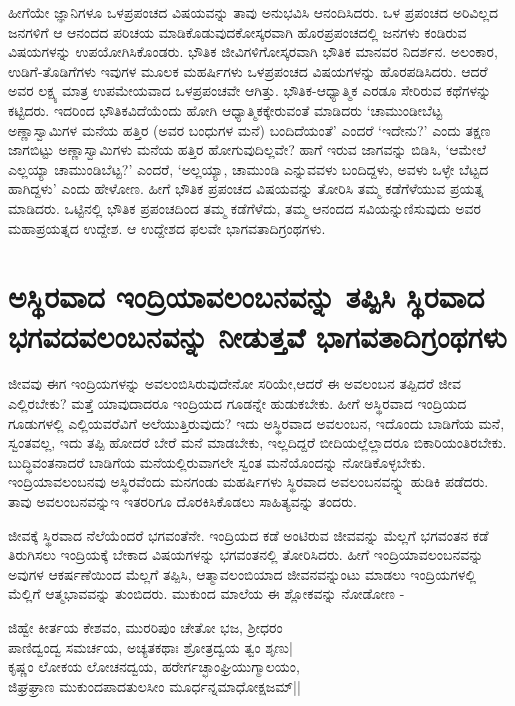 ಹೀಗೆಯೇ ಜ್ಞಾನಿಗಳೂ ಒಳಪ್ರಪಂಚದ ವಿಷಯವನ್ನು ತಾವು ಅನುಭವಿಸಿ ಆನಂದಿಸಿದರು. ಒಳ ಪ್ರಪಂಚದ ಅರಿವಿಲ್ಲದ ಜನಗಳಿಗೆ ಆ ಆನಂದದ ಪರಿಚಯ ಮಾಡಿಕೊಡುವುದಕೋಸ್ಕರವಾಗಿ ಹೊರಪ್ರಪಂಚದಲ್ಲಿ ಜನಗಳು ಕಂಡಿರುವ ವಿಷಯಗಳನ್ನು ಉಪಯೋಗಿಸಿಕೊಂಡರು. ಭೌತಿಕ ಜೀವಿಗಳಿಗೋಸ್ಕರವಾಗಿ ಭೌತಿಕ ಮಾನವರ ನಿದರ್ಶನ. ಅಲಂಕಾರ, ಉಡಿಗೆ-ತೊಡಿಗೆಗಳು ಇವುಗಳ ಮೂಲಕ ಮಹರ್ಷಿಗಳು ಒಳಪ್ರಪಂಚದ ವಿಷಯಗಳನ್ನು ಹೊರಪಡಿಸಿದರು. ಆದರೆ ಅವರ ಲಕ್ಷ್ಯ ಮಾತ್ರ ಉಪಮೇಯವಾದ ಒಳಪ್ರಪಂಚವೇ ಆಗಿತ್ತು. ಭೌತಿಕ-ಆಧ್ಯಾತ್ಮಿಕ ಎರಡೂ ಸೇರಿರುವ ಕಥೆಗಳನ್ನು ಕಟ್ಟಿದರು. ಇದರಿಂದ ಭೌತಿಕವಿದೆಯೆಂದು ಹೋಗಿ ಆಧ್ಯಾತ್ಮಿಕಕ್ಕೇರುವಂತೆ ಮಾಡಿದರು `ಚಾಮುಂಡೀಬೆಟ್ಟ ಅಣ್ಣಾಸ್ವಾಮಿಗಳ ಮನೆಯ ಹತ್ತಿರ (ಅವರ ಬಂಧುಗಳ ಮನೆ) ಬಂದಿದೆಯಂತೆ' ಎಂದರೆ `ಇದೇನು?' ಎಂದು ತಕ್ಷಣ ಜಾಗಬಿಟ್ಟು ಅಣ್ಣಾಸ್ವಾಮಿಗಳು ಮನೆಯ ಹತ್ತಿರ ಹೋಗುವುದಿಲ್ಲವೇ? ಹಾಗೆ ಇರುವ ಜಾಗವನ್ನು ಬಿಡಿಸಿ, `ಆಮೇಲೆ ಎಲ್ಲಯ್ಯಾ ಚಾಮುಂಡಿಬೆಟ್ಟ?' ಎಂದರೆ, `ಅಲ್ಲಯ್ಯಾ, ಚಾಮುಂಡಿ ಎನ್ನುವವಳು ಬಂದಿದ್ದಳು, ಅವಳು ಒಳ್ಳೇ ಬೆಟ್ಟದ ಹಾಗಿದ್ದಳು' ಎಂದು ಹೇಳೋಣ. ಹೀಗೆ ಭೌತಿಕ ಪ್ರಪಂಚದ ವಿಷಯವನ್ನು ತೋರಿಸಿ ತಮ್ಮ ಕಡೆಗೆಳೆಯುವ ಪ್ರಯತ್ನ ಮಾಡಿದರು. ಒಟ್ಟಿನಲ್ಲಿ ಭೌತಿಕ ಪ್ರಪಂಚದಿಂದ ತಮ್ಮ ಕಡೆಗೆಳೆದು, ತಮ್ಮ ಆನಂದದ ಸವಿಯನ್ನುಣಿಸುವುದು ಅವರ ಮಹಾಪ್ರಯತ್ನದ ಉದ್ದೇಶ. ಆ ಉದ್ದೇಶದ ಫಲವೇ ಭಾಗವತಾದಿಗ್ರಂಥಗಳು.

\section*{ಅಸ್ಥಿರವಾದ ಇಂದ್ರಿಯಾವಲಂಬನವನ್ನು ತಪ್ಪಿಸಿ ಸ್ಥಿರವಾದ ಭಗವದವಲಂಬನವನ್ನು ನೀಡುತ್ತವೆ ಭಾಗವತಾದಿಗ್ರಂಥಗಳು}

ಜೀವವು ಈಗ ಇಂದ್ರಿಯಗಳನ್ನು ಅವಲಂಬಿಸಿರುವುದೇನೋ ಸರಿಯೇ,‌ಆದರೆ ಈ ಅವಲಂಬನ ತಪ್ಪಿದರೆ ಜೀವ ಎಲ್ಲಿರಬೇಕು? ಮತ್ತೆ ಯಾವುದಾದರೂ ಇಂದ್ರಿಯದ ಗೂಡನ್ನೇ ಹುಡುಕಬೇಕು. ಹೀಗೆ ಅಸ್ಥಿರವಾದ ಇಂದ್ರಿಯದ ಗೂಡುಗಳಲ್ಲಿ ಎಲ್ಲಿಯವರೆವಿಗೆ ಅಲೆಯುತ್ತಿರುವುದು? ಇದು ಅಸ್ಥಿರವಾದ ಅವಲಂಬನ, ಇದೊಂದು ಬಾಡಿಗೆಯ ಮನೆ, ಸ್ವಂತವಲ್ಲ, ಇದು ತಪ್ಪಿ ಹೋದರೆ ಬೇರೆ ಮನೆ ಮಾಡಬೇಕು, ಇಲ್ಲದಿದ್ದರೆ ಬೀದಿಯಲ್ಲೆಲ್ಲಾದರೂ ಬಿಕಾರಿಯಂತಿರಬೇಕು. ಬುದ್ಧಿವಂತನಾದರೆ ಬಾಡಿಗೆಯ ಮನೆಯಲ್ಲಿರುವಾಗಲೇ ಸ್ವಂತ ಮನೆಯೊಂದನ್ನು ನೋಡಿಕೊಳ್ಳಬೇಕು. ಇಂದ್ರಿಯಾವಲಂಬನವು ಅಸ್ಥಿರವೆಂದು ಮನಗಂಡು ಮಹರ್ಷಿಗಳು ಸ್ಥಿರವಾದ ಅವಲಂಬನವನ್ನ್ನು ಹುಡಿಕಿ ಪಡೆದರು. ತಾವು ಅವಲಂಬನವನ್ನುಇ ಇತರರಿಗೂ ದೊರಕಿಸಿಕೊಡಲು ಸಾಹಿತ್ಯವನ್ನು ತಂದರು.

ಜೀವಕ್ಕೆ ಸ್ಥಿರವಾದ ನೆಲೆಯೆಂದರೆ ಭಗವಂತೆನೇ. ಇಂದ್ರಿಯದ ಕಡೆ ಅಂಟಿರುವ ಜೀವವನ್ನು  ಮೆಲ್ಲಗೆ ಭಗವಂತನ ಕಡೆ ತಿರುಗಿಸಲು ಇಂದ್ರಿಯಕ್ಕೆ ಬೇಕಾದ ವಿಷಯಗಳನ್ನು ಭಗವಂತನಲ್ಲಿ ತೋರಿಸಿದರು. ಹೀಗೆ ಇಂದ್ರಿಯಾವಲಂಬನವನ್ನು  ಅವುಗಳ ಆಕರ್ಷಣೆಯಿಂದ ಮೆಲ್ಲಗೆ ತಪ್ಪಿಸಿ, ಆತ್ಮಾವಲಂಬಿಯಾದ ಜೀವನವನ್ನುಂಟು ಮಾಡಲು ಇಂದ್ರಿಯಗಳಲ್ಲಿ ಮೆಲ್ಲಿಗೆ ಆತ್ಮಭಾವವನ್ನು ತುಂಬಿದರು. ಮುಕುಂದ ಮಾಲೆಯ ಈ ಶ್ಲೋಕವನ್ನು ನೋಡೋಣ -

\begin{shloka}
ಜಿಹ್ವೇ ಕೀರ್ತಯ ಕೇಶವಂ, ಮುರರಿಪುಂ ಚೇತೋ ಭಜ, ಶ್ರೀಧರಂ\\
ಪಾಣಿದ್ವಂದ್ವ ಸಮರ್ಚಯ, ಅಚ್ಯತಕಥಾಃ ಶ್ರೋತ್ರದ್ವಯ ತ್ವಂ ಶೃಣು|\\
ಕೃಷ್ಣಂ ಲೋಕಯ ಲೋಚನದ್ವಯ, ಹರೇರ್ಗಚ್ಛಾಂಘ್ರಿಯುಗ್ಮಾಲಯಂ,\\
ಜಿಘ್ರಘ್ರಾಣ ಮುಕುಂದಪಾದತುಲಸೀಂ ಮೂರ್ಧನ್ನಮಾಧೋಕ್ಷಜಮ್||
\end{shloka}

